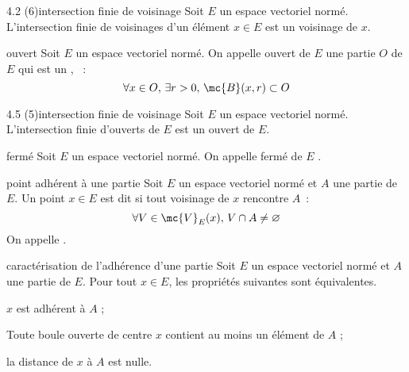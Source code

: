 

\begin{adjustwidth}{-3cm}{-3cm}


\begin{proposition}{4.2 (6)}{intersection finie de voisinage}
    Soit $E$ un espace vectoriel normé. L'intersection finie de voisinages d'un élément $x \in E$ est un voisinage de $x$.
\end{proposition}

\begin{definition}{4.4}{ouvert}
    Soit $E$ un espace vectoriel normé. On appelle ouvert de $E$ une partie $O$ de $E$ qui est un , \ie~:
    $$\forall x \in O,\, \exists r > 0,\, \mc{B}(x,r) \subset O$$
\end{definition}

\begin{proposition}{4.5 (5)}{intersection finie de voisinage}
    Soit $E$ un espace vectoriel normé. L'intersection finie d'ouverts de $E$ est un ouvert de $E$.
\end{proposition}

\begin{definition}{4.6}{fermé}
    Soit $E$ un espace vectoriel normé. On appelle fermé de $E$ .
\end{definition}


\begin{definition}{4.9}{point adhérent à une partie}
    Soit $E$ un espace vectoriel normé et $A$ une partie de $E$. Un point $x \in E$ est dit  si tout voisinage de $x$ rencontre $A$~:
    $$\forall V \in \mc{V}_E(x),\, V \cap A \neq \varnothing$$
    On appelle .
\end{definition}

\begin{proposition}{4.10}{caractérisation de l'adhérence d'une partie}
    Soit $E$ un espace vectoriel normé et $A$ une partie de $E$. Pour tout $x \in E$, les propriétés suivantes sont équivalentes.
    \begin{enumeratebf}
        \item $x$ est adhérent à $A$ ;
        \item Toute boule ouverte de centre $x$ contient au moins un élément de $A$ ;
        \item la distance de $x$ à $A$ est nulle.
    \end{enumeratebf}
\end{proposition}


\end{adjustwidth}
